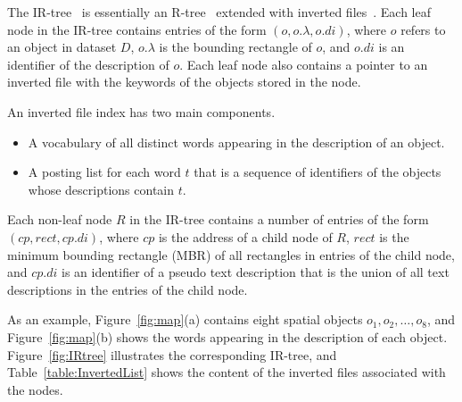 \documentclass{sig-alternate}
\newcounter{example}[section]
\begin{document}
The IR-tree~\cite{vldb09} is essentially an R-tree~\cite{Antonin84}
extended with inverted files~\cite{zobel}. Each leaf node in the
IR-tree contains entries of the form $(o, o.\lambda, o.di)$, where
$o$ refers to an object in dataset $D$, $o.\lambda$ is the bounding
rectangle of $o$, and $o.di$ is an identifier of the description of
$o$. Each leaf node also contains a pointer to an inverted file with
the keywords of the objects stored in the node.


An inverted file index has two main components.
%
\begin{itemize}\itemsep=-2pt
\item A vocabulary of all distinct words appearing in the description
  of an object.
\item A posting list for each word $t$ that is a sequence of
  identifiers of the objects whose descriptions contain $t$.
\end{itemize}

Each non-leaf node $R$ in the IR-tree contains a number of entries
of the form $(cp, rect, cp.di)$, where $cp$ is the address of a
child node of $R$, $rect$ is the minimum bounding rectangle (MBR) of
all rectangles in entries of the child node, and $cp.di$ is an
identifier of a pseudo text description that is the union of all
text descriptions in the entries of the child node.

As an example, Figure~\ref{fig:map}(a) contains eight
spatial objects $o_1, o_2, \ldots, o_8$, and Figure~\ref{fig:map}(b)
shows the words appearing in the description of each object.
%
Figure~\ref{fig:IRtree} illustrates the corresponding IR-tree, and
Table~\ref{table:InvertedList} shows the content of the inverted
files associated with the nodes.
\end{document}
